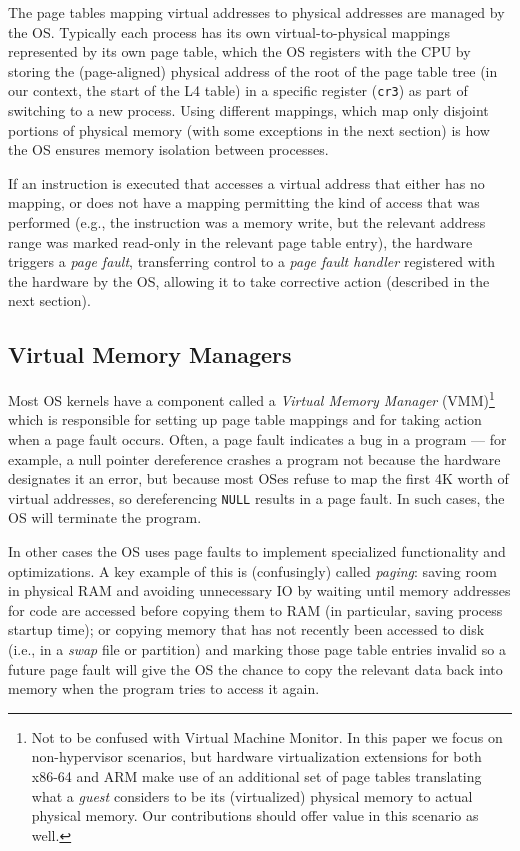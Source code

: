 \documentclass[acmsmall,screen,nonacm]{acmart}
\begin{document}
The page tables mapping virtual addresses to physical addresses are managed by the OS. Typically each process has its own 
virtual-to-physical mappings represented by its own page table, which the OS registers with the CPU by storing the (page-aligned)
physical address of the root of the page table tree (in our context, the start of the L4 table) in a 
specific register (\texttt{cr3}) as part of switching to a new process. 
Using different mappings, which map only disjoint portions of physical memory (with some exceptions in the next section) 
is how the OS ensures memory isolation between processes.

If an instruction is executed that accesses a virtual address that either has no mapping, or does not have a mapping permitting the kind of access that was performed (e.g., the instruction was a memory write, but the relevant address range was marked read-only in the relevant page table entry), the hardware triggers a \emph{page fault}, transferring control to a \emph{page fault handler} registered with the hardware by the OS, allowing it to take corrective action (described in the next section).

\subsection{Virtual Memory Managers}
\label{sec:backgroundonvmm}
Most OS kernels have a component called a \emph{Virtual Memory Manager} (VMM)\footnote{Not to be confused with Virtual 
Machine Monitor. In this paper we focus on non-hypervisor scenarios, but hardware virtualization extensions for both 
x86-64 and ARM make use of an additional set of page tables translating what a \emph{guest} considers to be its 
(virtualized) physical memory to actual physical memory. Our contributions should offer value in this scenario as well.}
which is responsible for setting up page table mappings and for taking action when a page fault occurs. Often, a page 
fault indicates a bug in a program --- for example, a null pointer dereference crashes a program not because the hardware
 designates it an error, but because most OSes refuse to map the first 4K worth of virtual addresses, so dereferencing 
\texttt{NULL} results in a page fault. In such cases, the OS will terminate the program.

In other cases the OS uses page faults to implement specialized functionality and optimizations. A key example of this is 
(confusingly) called \emph{paging}: saving room in physical RAM and avoiding unnecessary IO 
by waiting until memory addresses for code are accessed 
before copying them to RAM (in particular, saving process startup time); 
or copying memory that has not recently been accessed to disk 
(i.e., in a \emph{swap} file or partition) and marking those page table entries invalid so a future page fault will give 
the OS the chance to copy the relevant data back into memory when the program tries to access it again.
\end{document}
